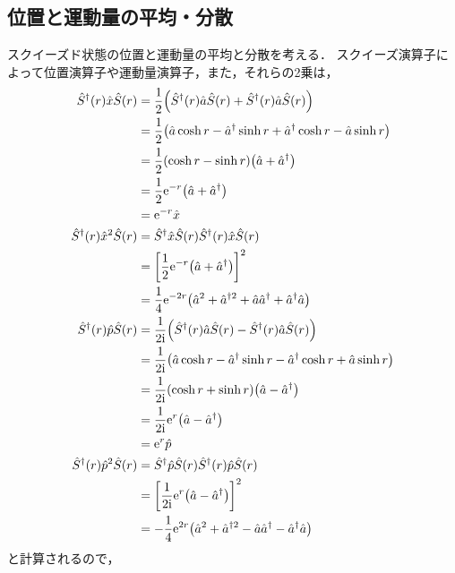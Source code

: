\documentclass{report}
\begin{document}
  \subsection{位置と運動量の平均・分散}
    スクイーズド状態の位置と運動量の平均と分散を考える．
    スクイーズ演算子によって位置演算子や運動量演算子，また，それらの2乗は，
    \begin{align}
      \hat{S}^{\dag}(r)\hat{x}\hat{S}(r) &= \frac{1}{2}\qty(\hat{S}^{\dag}(r)\hat{a}\hat{S}(r) + \hat{S}^{\dag}(r)\hat{a}\hat{S}(r)) \\ 
      &= \frac{1}{2}\qty(\hat{a}\cosh r - \hat{a}^{\dag}\sinh r + \hat{a}^{\dag}\cosh r - \hat{a}\sinh r) \\ 
      &= \frac{1}{2}\qty(\cosh r - \sinh r)\qty(\hat{a} + \hat{a}^{\dag}) \\ 
      &= \frac{1}{2}\mathrm{e}^{-r}\qty(\hat{a} + \hat{a}^{\dag}) \\ 
      &= \mathrm{e}^{-r}\hat{x} \\ 
      \hat{S}^{\dag}(r)\hat{x}^2\hat{S}(r) &= \hat{S}^{\dag}\hat{x}\hat{S}(r)\hat{S}^{\dag}(r)\hat{x}\hat{S}(r) \\ 
      &= \qty[\frac{1}{2}\mathrm{e}^{-r}\qty(\hat{a} + \hat{a}^{\dag})]^2 \\ 
      &= \frac{1}{4}\mathrm{e}^{-2r}\qty(\hat{a}^2 + \hat{a}^{\dag 2} + \hat{a}\hat{a}^{\dag} + \hat{a}^{\dag}\hat{a}) \\ 
      \hat{S}^{\dag}(r)\hat{p}\hat{S}(r) &= \frac{1}{2\mathrm{i}}\qty(\hat{S}^{\dag}(r)\hat{a}\hat{S}(r) - \hat{S}^{\dag}(r)\hat{a}\hat{S}(r)) \\ 
      &= \frac{1}{2\mathrm{i}}\qty(\hat{a}\cosh r - \hat{a}^{\dag}\sinh r - \hat{a}^{\dag}\cosh r + \hat{a}\sinh r) \\ 
      &= \frac{1}{2\mathrm{i}}\qty(\cosh r + \sinh r)\qty(\hat{a} - \hat{a}^{\dag}) \\ 
      &= \frac{1}{2\mathrm{i}}\mathrm{e}^{r}\qty(\hat{a} - \hat{a}^{\dag}) \\ 
      &= \mathrm{e}^{r}\hat{p} \\ 
      \hat{S}^{\dag}(r)\hat{p}^2\hat{S}(r) &= \hat{S}^{\dag}\hat{p}\hat{S}(r)\hat{S}^{\dag}(r)\hat{p}\hat{S}(r) \\ 
      &= \qty[\frac{1}{2\mathrm{i}}\mathrm{e}^{r}\qty(\hat{a} - \hat{a}^{\dag})]^2 \\ 
      &= -\frac{1}{4}\mathrm{e}^{2r}\qty(\hat{a}^2 + \hat{a}^{\dag 2} - \hat{a}\hat{a}^{\dag} - \hat{a}^{\dag}\hat{a})
    \end{align}
    と計算されるので，
\end{document}
